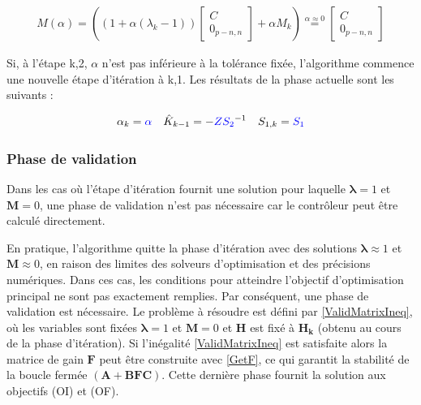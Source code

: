 \begin{equation}
    \begin{gathered}
        \hat{M}(\alpha) = \left((1+\alpha (\lambda_k-1))
        \begin{bmatrix}
            C \\
            0_{p-n,n}
        \end{bmatrix}
        + 
        \alpha M_k\right)
        \stackrel{\alpha \approx 0 }{=}
        \begin{bmatrix}
            C \\
            0_{p-n,n}
        \end{bmatrix}
    \end{gathered}
    \label{Artificiu3}
\end{equation}

Si, à l'étape k,2, $\alpha$ n'est pas inférieure à la tolérance fixée, l'algorithme commence une nouvelle étape d'itération à k,1. Les résultats de la phase actuelle sont les suivants :

\begin{equation}
    \begin{gathered}
\alpha_k=\textcolor{blue}{\alpha}  \quad
        \hat{K}_{k-1} = -\textcolor{blue}{Z} \textcolor{blue}{S_2}^{-1} \quad
        S_{1,k} = \textcolor{blue}{S_1}
    \end{gathered}
    \label{OutputsIterStap1}
\end{equation}

\subsubsection{Phase de validation}
Dans les cas où l'étape d'itération fournit une solution pour laquelle $\boldsymbol{\lambda} = 1 $ et $\boldsymbol{M} = 0$, une phase de validation n'est pas nécessaire car le contrôleur peut être calculé directement. 

En pratique, l'algorithme quitte la phase d'itération avec des solutions $\boldsymbol{\lambda} \approx 1$ et $\boldsymbol{M} \approx 0$, en raison des limites des solveurs d'optimisation et des précisions numériques. Dans ces cas, les conditions pour atteindre l'objectif d'optimisation principal ne sont pas exactement remplies. Par conséquent, une phase de validation est nécessaire. Le problème à résoudre est défini par \eqref{ValidMatrixIneq}, où les variables sont fixées $\boldsymbol{\lambda} = 1$ et $\boldsymbol{M} = 0$ et $\boldsymbol{H}$ est fixé à $\boldsymbol{H_k}$ (obtenu au cours de la phase d'itération).
Si l'inégalité \eqref{ValidMatrixIneq} est satisfaite alors la matrice de gain $\boldsymbol{F}$ peut être construite avec \eqref{GetF}, ce qui garantit la stabilité de la boucle fermée $(\boldsymbol{A}+\boldsymbol{B}\boldsymbol{F}\boldsymbol{C})$. Cette dernière phase fournit la solution aux objectifs (OI) et (OF). 

